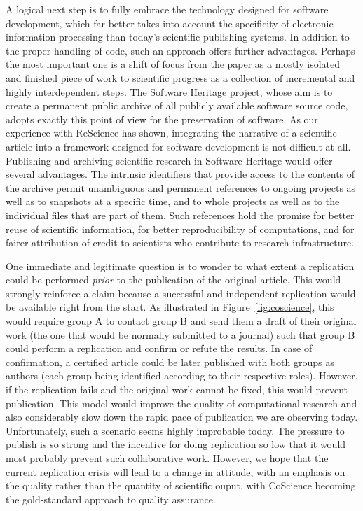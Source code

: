 \documentclass[a4paper,10pt, twocolumn]{article}
\begin{document}
A logical next step is to fully embrace the technology designed for
software development, which far better takes into account the
specificity of electronic information processing than today's
scientific publishing systems. In addition to the proper handling of
code, such an approach offers further advantages. Perhaps the most
important one is a shift of focus from the paper as a mostly isolated
and finished piece of work to scientific progress as a collection of
incremental and highly interdependent steps. The
\href{https://www.softwareheritage.org/}{Software Heritage} project,
whose aim is to create a permanent public archive of all publicly
available software source code, adopts exactly this point of view for
the preservation of software. As our experience with ReScience has
shown, integrating the narrative of a scientific article into a
framework designed for software development is not difficult at all.
Publishing and archiving scientific research in Software Heritage
would offer several advantages. The intrinsic identifiers that provide
access to the contents of the archive permit unambiguous and permanent
references to ongoing projects as well as to snapshots at a specific
time, and to whole projects as well as to the individual files that
are part of them. Such references hold the promise for better reuse of
scientific information, for better reproducibility of
computations, and for fairer attribution of credit to scientists
who contribute to research infrastructure.


One immediate and legitimate question is to wonder to what extent a
replication could be performed \textit{prior} to the publication of
the original article. This would strongly reinforce a claim because a
successful and independent replication would be available right from
the start. As illustrated in Figure~\ref{fig:coscience}, this would
require group A to contact group B and send them a draft of
their original work (the one that would be normally submitted to a
journal) such that group B could perform a replication and confirm or
refute the results. In case of confirmation, a certified article could
be later published with both groups as authors (each group being
identified according to their respective roles). However, if the
replication fails and the original work cannot be fixed, this would
prevent publication. This model would improve the quality of
computational research and also considerably slow down the rapid pace
of publication we are observing today. Unfortunately, such a scenario
seems highly improbable today. The pressure to publish is so strong
and the incentive for doing replication so low that it would most
probably prevent such collaborative work. However, we hope that the
current replication crisis will lead to a change in attitude, with
an emphasis on the quality rather than the quantity of scientific ouput,
with CoScience becoming the gold-standard approach to quality assurance.




\renewcommand*{\bibfont}{\footnotesize}
\printbibliography[title=References]
\end{document}
